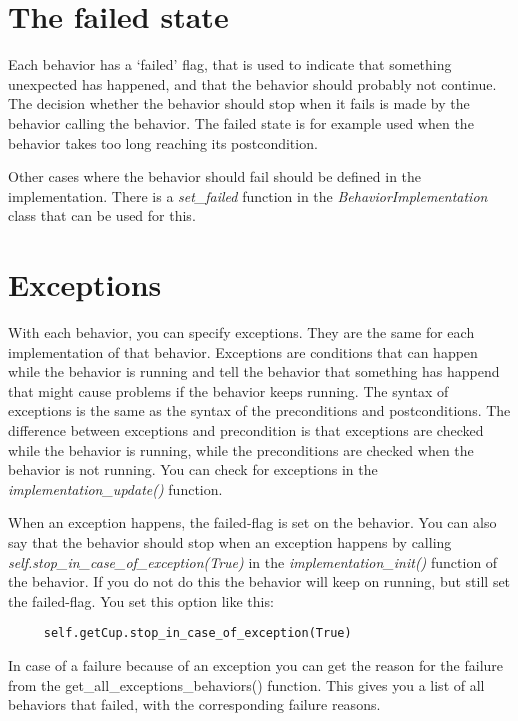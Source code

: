 \documentclass[a4paper, 10pt, oneside]{article}
\newcommand{\cod}[1]{\emph{#1}}
\begin{document}
\section{The failed state}

Each behavior has a `failed' flag, that is used to indicate that something unexpected has happened,
and that the behavior should probably not continue. The decision whether the behavior should stop
when it fails is made by the behavior calling the behavior. The failed state is for example used
when the behavior takes too long reaching its postcondition.

Other cases where the behavior should fail should be defined in the implementation. There is a
\cod{set\_failed} function in the \cod{BehaviorImplementation} class that can be used for this.

\section{Exceptions}

With each behavior, you can specify exceptions. They are the same for each implementation of
that behavior. Exceptions are conditions that can happen while the behavior is running and tell
the behavior that something has happend that might cause problems if the behavior keeps
running. The syntax of exceptions is the same as the syntax of the preconditions and postconditions.
The difference between exceptions and precondition is that exceptions are checked while the behavior is
running, while the preconditions are checked when the behavior is not running. You can check for
exceptions in the \cod{implementation\_update()} function.

When an exception happens, the failed-flag is set on the behavior. You can also say that the
behavior should stop when an exception happens by calling
\cod{self.stop\_in\_case\_of\_exception(True)} in the \cod{implementation\_init()} function of the
behavior. If you do not do this the behavior will keep on running, but still set the failed-flag.
You set this option like this:

\begin{verbatim}
     self.getCup.stop_in_case_of_exception(True)
\end{verbatim}

In case of a failure because of an exception you can get the reason for the failure from the
get\_all\_exceptions\_behaviors() function. This gives you a list of all behaviors that failed,
with the corresponding failure reasons.
\end{document}
